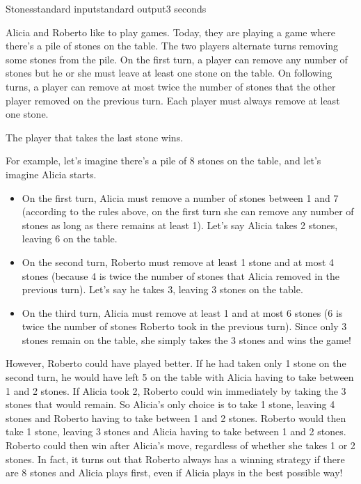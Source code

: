 \begin{problem}{Stones}{standard input}{standard output}{3 seconds}

Alicia and Roberto like to play games. Today, they are playing a game where there's a pile of stones on the table. The two players alternate turns removing some stones from the pile. On the first turn, a player can remove any number of stones but he or she must leave at least one stone on the table. On following turns, a player can remove at most twice the number of stones that the other player removed on the previous turn. Each player must always remove at least one stone.

The player that takes the last stone wins.

For example, let's imagine there's a pile of 8 stones on the table, and let's imagine Alicia starts.

\begin{itemize}
  \item{On the first turn, Alicia must remove a number of stones between 1 and 7 (according to the rules above, on the first turn she can remove any number of stones as long as there remains at least 1). Let's say Alicia takes 2 stones, leaving 6 on the table.}
  \item{On the second turn, Roberto must remove at least 1 stone and at most 4 stones (because 4 is twice the number of stones that Alicia removed in the previous turn). Let's say he takes 3, leaving 3 stones on the table.}
  \item{On the third turn, Alicia must remove at least 1 and at most 6 stones (6 is twice the number of stones Roberto took in the previous turn). Since only 3 stones remain on the table, she simply takes the 3 stones and wins the game!}
\end{itemize}

However, Roberto could have played better. If he had taken only 1 stone on the second turn, he would have left 5 on the table with Alicia having to take between 1 and 2 stones. If Alicia took 2, Roberto could win immediately by taking the 3 stones that would remain. So Alicia's only choice is to take 1 stone, leaving 4 stones and Roberto having to take between 1 and 2 stones. Roberto would then take 1 stone, leaving 3 stones and Alicia having to take between 1 and 2 stones. Roberto could then win after Alicia's move, regardless of whether she takes 1 or 2 stones. In fact, it turns out that Roberto always has a winning strategy if there are 8 stones and Alicia plays first, even if Alicia plays in the best possible way!


\end{problem}
